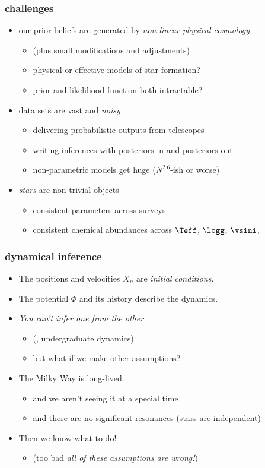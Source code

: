 \documentclass[pdftex]{beamer}
\begin{document}
\begin{frame}
  \frametitle{challenges}
  \begin{itemize}
  \item our prior beliefs are generated by \emph{non-linear physical cosmology}
    \begin{itemize}
    \item (plus small modifications and adjustments)
    \item physical or effective models of star formation?
    \item prior and likelihood function both intractable?
    \end{itemize}
  \item data sets are vast and \emph{noisy}
    \begin{itemize}
    \item delivering probabilistic outputs from telescopes
    \item writing inferences with posteriors in and posteriors out
    \item non-parametric models get huge ($N^{2.6}$-ish or worse)
    \end{itemize}
  \item \emph{stars} are non-trivial objects
    \begin{itemize}
    \item consistent parameters across surveys
    \item consistent chemical abundances across $\Teff$, $\logg$, $\vsini$, \etc
    \end{itemize}
  \end{itemize}
\end{frame}

\begin{frame}
  \frametitle{dynamical inference}
  \begin{itemize}
  \item The positions and velocities $X_n$ are \emph{initial conditions}.
  \item The potential $\Phi$ and its history describe the dynamics.
  \item \emph{You can't infer one from the other.}
    \begin{itemize}
    \item (\cf, undergraduate dynamics)
    \item<2-> but what if we make other assumptions?
    \end{itemize}
  \item<2-> The Milky Way is long-lived.
    \begin{itemize}
    \item and we aren't seeing it at a special time
    \item and there are no significant resonances (stars are independent)
    \end{itemize}
  \item<2-> Then we know what to do!
    \begin{itemize}
    \item<3-> (too bad \emph{all of these assumptions are wrong!})
    \end{itemize}
  \end{itemize}
\end{frame}
\end{document}
